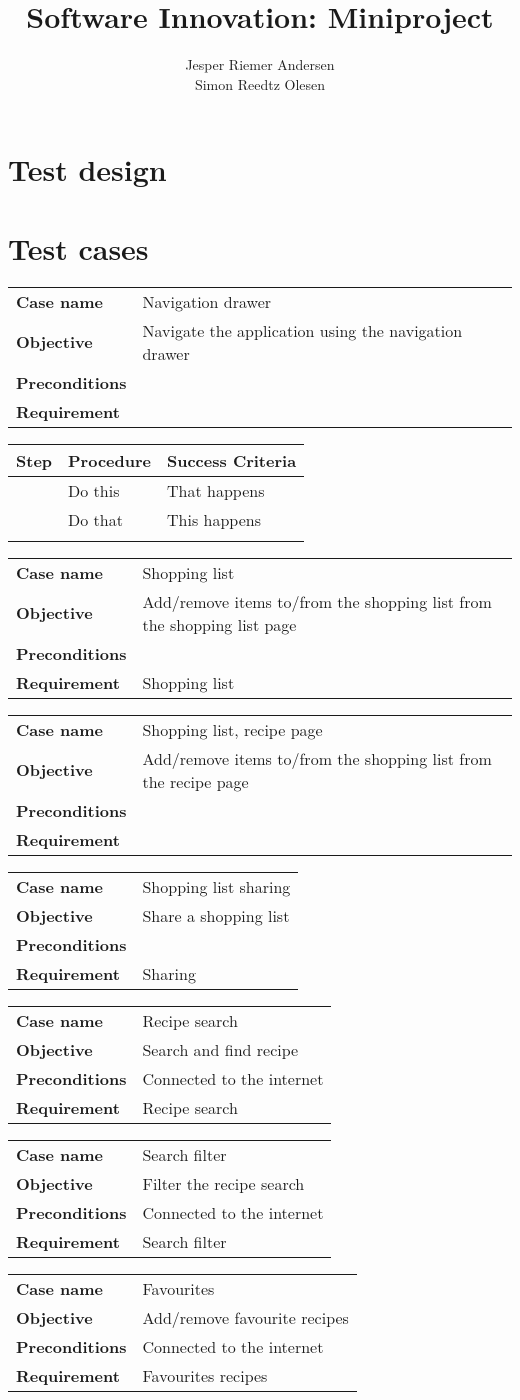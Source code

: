 \documentclass[a4paper,12pt]{report}
\title{Software Innovation: Miniproject}
\author{Jesper Riemer Andersen\\Simon Reedtz Olesen}
\newcommand{\testdesign}[5]
{
}
\newcommand{\testcase}[4]
{
\begin{center}
\begin{tabular}{p{2.6cm} p{10cm}}
\hline
\textbf{Case name} & #1\\
\textbf{Objective} & #2\\
\textbf{Preconditions} & #3\\
\textbf{Requirement} & #4\\
\hline
\end{tabular}
\end{center}
}
\newcounter{counter}
\newenvironment{testprocedure}%
{\newcommand{\step}{\arabic{counter}\stepcounter{counter}}
\setcounter{counter}{1}
\begin{center}
\begin{tabular}{| c | p{5.4cm} | p{5.4cm} |}
\hline
\textbf{Step} & \textbf{Procedure} & \textbf{Success Criteria}\\
\hline}
{\hline
\multicolumn{3}{c}{} \\%
\end{tabular}
\end{center}}
\begin{document}
\maketitle

\section*{Test design}

\testdesign
{Shopping list test}
{The add/remove function of items to the shopping list. Although not the target of this, the recipe activity will be indirectly tested in the process of testing the add/remove items to the shopping list functionality.}
{A shopping list written in hand will be created and then added to the shopping list in the application. Items from the recipe will be added to the shopping list.}
{\begin{itemize}[nolistsep]
\item 
\end{itemize}}
{A pass is when all test cases are run without finding a bug.}

\pagebreak
\section*{Test cases}

\testcase
{Navigation drawer}
{Navigate the application using the navigation drawer}
{}
{}

\begin{testprocedure}
\step & Do this & That happens\\
\hline
\step & Do that & This happens\\
\end{testprocedure}

\testcase
{Shopping list}
{Add/remove items to/from the shopping list from the shopping list page}
{}
{Shopping list}

\testcase
{Shopping list, recipe page}
{Add/remove items to/from the shopping list from the recipe page}
{}
{}

\testcase
{Shopping list sharing}
{Share a shopping list}
{}
{Sharing}

\testcase
{Recipe search}
{Search and find recipe}
{Connected to the internet}
{Recipe search}

\testcase
{Search filter}
{Filter the recipe search}
{Connected to the internet}
{Search filter}

\testcase
{Favourites}
{Add/remove favourite recipes}
{Connected to the internet}
{Favourites recipes}
\end{document}
